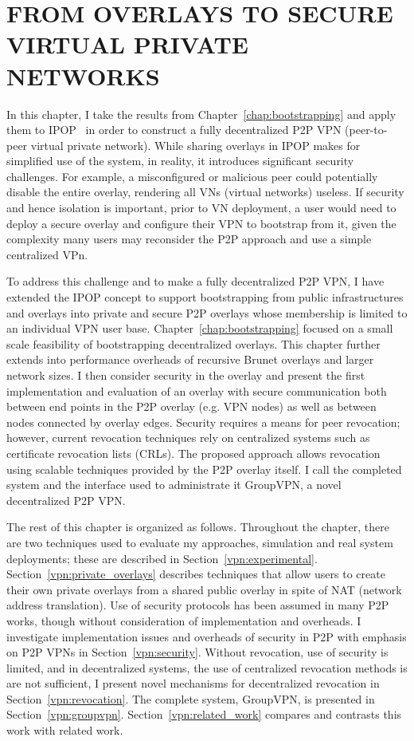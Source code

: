 \chapter{FROM OVERLAYS TO SECURE VIRTUAL PRIVATE NETWORKS}
\label{chap:security}

In this chapter, I take the results from Chapter~\ref{chap:bootstrapping} and
apply them to IPOP~\cite{ipop} in order to construct a fully decentralized P2P
VPN (peer-to-peer virtual private network).  While sharing overlays in IPOP
makes for simplified use of the system, in reality, it introduces significant
security challenges.  For example, a misconfigured or malicious peer could
potentially disable the entire overlay, rendering all VNs (virtual networks)
useless.  If security and hence isolation is important, prior to VN deployment,
a user would need to deploy a secure overlay and configure their VPN to
bootstrap from it, given the complexity many users may reconsider the P2P
approach and use a simple centralized VPn.

To address this challenge and to make a fully decentralized P2P VPN, I have
extended the IPOP concept to support bootstrapping from public infrastructures
and overlays into private and secure P2P overlays whose membership is limited
to an individual VPN user base.  Chapter~\ref{chap:bootstrapping} focused on a
small scale feasibility of bootstrapping decentralized overlays.  This chapter
further extends into performance overheads of recursive Brunet overlays and
larger network sizes.  I then consider security in the overlay and present the
first implementation and evaluation of an overlay with secure communication
both between end points in the P2P overlay (e.g. VPN nodes) as well as between
nodes connected by overlay edges.  Security requires a means for peer
revocation; however, current revocation techniques rely on centralized systems
such as certificate revocation lists (CRLs). The proposed approach allows
revocation using scalable techniques provided by the P2P overlay itself.  I
call the completed system and the interface used to administrate it GroupVPN, a
novel decentralized P2P VPN.

The rest of this chapter is organized as follows.  Throughout the chapter,
there are two techniques used to evaluate my approaches, simulation and real
system deployments; these are described in Section~\ref{vpn:experimental}.
Section~\ref{vpn:private_overlays} describes techniques that allow users to
create their own private overlays from a shared public overlay in spite of NAT
(network address translation).  Use of security protocols has been assumed in
many P2P works, though without consideration of implementation and overheads. I
investigate implementation issues and overheads of security in P2P with
emphasis on P2P VPNs in Section~\ref{vpn:security}.  Without revocation, use of
security is limited, and in decentralized systems, the use of centralized
revocation methods is are not sufficient, I present novel mechanisms for
decentralized revocation in Section~\ref{vpn:revocation}.  The complete system,
GroupVPN, is presented in Section~\ref{vpn:groupvpn}.
Section~\ref{vpn:related_work} compares and contrasts this work with related
work.  

